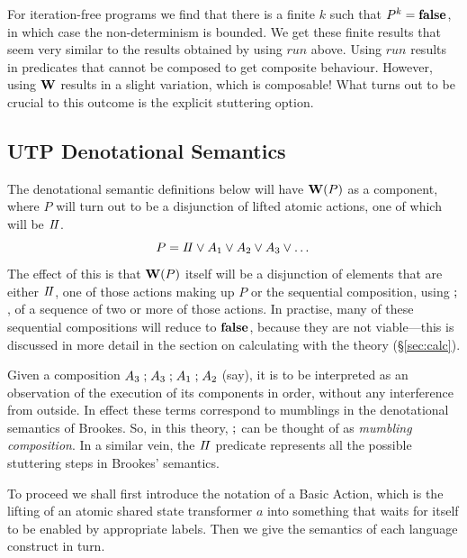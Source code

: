 For iteration-free programs
we find that there is a finite $k$ such that $P^k = \mathbf{false}$,
in which case the non-determinism is bounded.
We get these finite results that seem very similar
to the results obtained by using $run$ above.
Using $run$ results in predicates that cannot be composed
to get composite behaviour.
However, using $\mathbf{W}$ results in a slight variation,
which is composable!
What turns out to be crucial
to this outcome is the explicit stuttering option.



\subsection{UTP Denotational Semantics}\label{ssec:UTP-denote}

The denotational semantic definitions below will have
$\mathbf{W}(P)$ as a component,
where $P$ will turn out to be a disjunction of lifted atomic actions,
one of which will be $I\!I$.
\[
  P = I\!I \lor A_1 \lor A_2 \lor A_3 \lor \dots
\]
The effect of this is that $\mathbf{W}(P)$ itself
will be a disjunction of elements that are
either $I\!I$, one of those actions making up $P$
or the sequential composition, using $\mathrel{;}$,
of a sequence of two or more of those actions.
In practise, many of these sequential compositions will reduce to $\mathbf{false}$,
because they are not viable---this is discussed in more detail in the section
on calculating with the theory (\S\ref{sec:calc}).

Given a composition $A_3\mathrel{;} A_3\mathrel{;} A_1 \mathrel{;} A_2$ (say),
it is to be interpreted as an observation
of the execution of its components in order,
without any interference from outside.
In effect these terms correspond to mumblings in the denotational
semantics of Brookes\cite{DBLP:journals/iandc/Brookes96}.
So, in this theory, $\mathrel{;}$ can be thought of as \emph{mumbling composition}.
In a similar vein, the $I\!I$ predicate represents
all the possible stuttering steps in Brookes' semantics.


To proceed we shall first introduce the notation of a Basic Action,
which is the lifting of an atomic shared state transformer $a$
into something that waits for itself to be enabled by appropriate labels.
Then we give the semantics of each language construct in turn.


